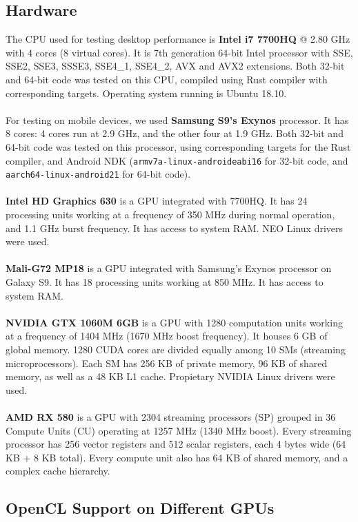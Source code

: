 \subsection{Hardware}
The CPU used for testing desktop performance is \textbf{Intel i7 7700HQ} @ 2.80 GHz with 4 cores (8 virtual cores). It is 7th generation 64-bit Intel processor with SSE, SSE2, SSE3, SSSE3, SSE4\_1, SSE4\_2, AVX and AVX2 extensions. Both 32-bit and 64-bit code was tested on this CPU, compiled using Rust compiler with corresponding targets. Operating system running is Ubuntu 18.10.\\
\\
For testing on mobile devices, we used \textbf{Samsung S9's Exynos} processor. It has 8 cores: 4 cores run at 2.9 GHz, and the other four at 1.9 GHz. Both 32-bit and 64-bit code was tested on this processor, using corresponding targets for the Rust compiler, and Android NDK (\texttt{armv7a-linux-androideabi16} for 32-bit code, and \texttt{aarch64-linux-android21} for 64-bit code).\\
\\
\textbf{Intel HD Graphics 630} is a GPU integrated with 7700HQ. It has 24 processing units working at a frequency of 350 MHz during normal operation, and 1.1 GHz burst frequency. It has access to system RAM. NEO Linux drivers were used.\\
\\
\textbf{Mali-G72 MP18} is a GPU integrated with Samsung's Exynos processor on Galaxy S9. It has 18 processing units working at 850 MHz. It has access to system RAM.\\
\\
\textbf{NVIDIA GTX 1060M 6GB} is a GPU with 1280 computation units working at a frequency of 1404 MHz (1670 MHz boost frequency). It houses 6 GB of global memory. 1280 CUDA cores are divided equally among 10 SMs (streaming microprocessors). Each SM has 256 KB of private memory, 96 KB of shared memory, as well as a 48 KB L1 cache. Propietary NVIDIA Linux drivers were used.\\
\\
\textbf{AMD RX 580} is a GPU with 2304 streaming processors (SP) grouped in 36 Compute Units (CU) operating at 1257 MHz (1340 MHz boost). Every streaming processor has 256 vector registers and 512 scalar registers, each 4 bytes wide (64 KB + 8 KB total). Every compute unit also has 64 KB of shared memory, and a complex cache hierarchy.\\

\subsection{OpenCL Support on Different GPUs}

